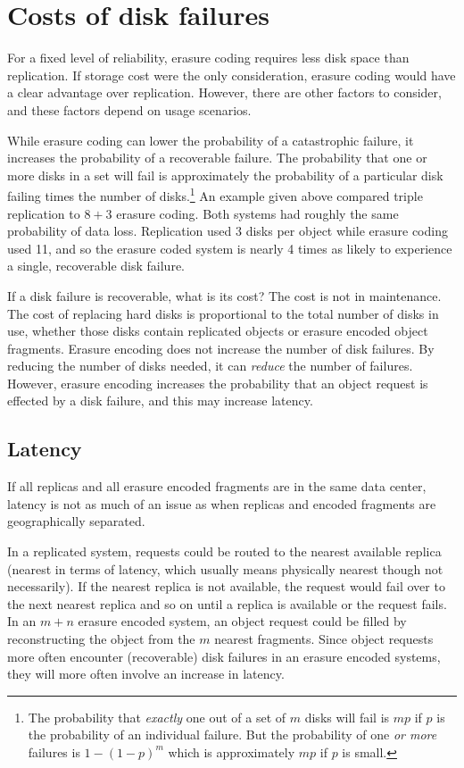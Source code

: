 \section{Costs of disk failures}

For a fixed level of reliability, erasure coding requires less disk space than replication. If storage cost were the only consideration, erasure coding would have a clear advantage over replication. However, there are other factors to consider, and these factors depend on usage scenarios.

While erasure coding can lower the probability of a catastrophic failure, it increases the probability of a recoverable failure. The probability that one or more disks in a set will fail is approximately the probability of a particular disk failing times the number of disks.\footnote{The probability that \emph{exactly} one out of a set of $m$ disks will fail is $mp$ if $p$ is the probability of an individual failure. But the probability of one \emph{or more} failures is $1-(1-p)^m$ which is approximately $mp$ if $p$ is small.} An example given above compared triple replication to $8+3$ erasure coding. Both systems had roughly the same probability of data loss. Replication used 3 disks per object while erasure coding used 11, and so the erasure coded system is nearly 4 times as likely to experience a single, recoverable disk failure.

If a disk failure is recoverable, what is its cost? The cost is not in maintenance. The cost of replacing hard disks is proportional to the total number of disks in use, whether those disks contain replicated objects or erasure encoded object fragments. Erasure encoding does not increase the number of disk failures. By reducing the number of disks needed, it can \emph{reduce} the number of failures. However, erasure encoding increases the probability that an object request is effected by a disk failure, and this may increase latency.

\subsection{Latency}

If all replicas and all erasure encoded fragments are in the same data center, latency is not as much of an issue as when replicas and encoded fragments are geographically separated. 

In a replicated system, requests could be routed to the nearest available replica (nearest in terms of latency, which usually means physically nearest though not necessarily). If the nearest replica is not available, the request would fail over to the next nearest replica and so on until a replica is available or the request fails. In an $m+n$ erasure encoded system, an object request could be filled by reconstructing the object from the $m$ nearest fragments. Since object requests more often encounter (recoverable) disk failures in an erasure encoded systems, they will more often involve an increase in latency.

